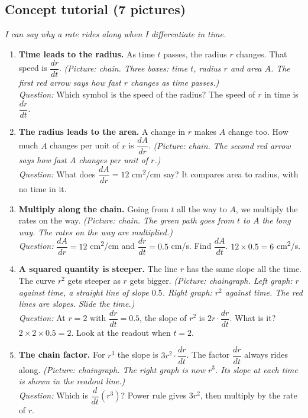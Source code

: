 \documentclass[11pt]{article}
\begin{document}
\subsection*{Concept tutorial (7 pictures)}
\textit{I can say why a rate rides along when I differentiate in time.}\par
\begin{enumerate}
\item \textbf{Time leads to the radius.} As time $t$ passes, the radius $r$ changes. That speed is $\dfrac{dr}{dt}$. \textit{(Picture: chain. Three boxes: time $t$, radius $r$ and area $A$. The first red arrow says how fast $r$ changes as time passes.)}\\ \textit{Question:} Which symbol is the speed of the radius?  The speed of $r$ in time is $\dfrac{dr}{dt}$.
\item \textbf{The radius leads to the area.} A change in $r$ makes $A$ change too. How much $A$ changes per unit of $r$ is $\dfrac{dA}{dr}$. \textit{(Picture: chain. The second red arrow says how fast $A$ changes per unit of $r$.)}\\ \textit{Question:} What does $\dfrac{dA}{dr}=12$ cm\textsuperscript{2}/cm say?  It compares area to radius, with no time in it.
\item \textbf{Multiply along the chain.} Going from $t$ all the way to $A$, we multiply the rates on the way. \textit{(Picture: chain. The green path goes from $t$ to $A$ the long way. The rates on the way are multiplied.)}\\ \textit{Question:} $\dfrac{dA}{dr}=12$ cm\textsuperscript{2}/cm and $\dfrac{dr}{dt}=0.5$ cm/s. Find $\dfrac{dA}{dt}$.  $12\times0.5=6$ cm\textsuperscript{2}/s.
\item \textbf{A squared quantity is steeper.} The line $r$ has the same slope all the time. The curve $r^2$ gets steeper as $r$ gets bigger. \textit{(Picture: chaingraph. Left graph: $r$ against time, a straight line of slope $0.5$. Right graph: $r^2$ against time. The red lines are slopes. Slide the time.)}\\ \textit{Question:} At $r=2$ with $\dfrac{dr}{dt}=0.5$, the slope of $r^2$ is $2r\cdot\dfrac{dr}{dt}$. What is it?  $2\times2\times0.5=2$. Look at the readout when $t=2$.
\item \textbf{The chain factor.} For $r^3$ the slope is $3r^2\cdot\dfrac{dr}{dt}$. The factor $\dfrac{dr}{dt}$ always rides along. \textit{(Picture: chaingraph. The right graph is now $r^3$. Its slope at each time is shown in the readout line.)}\\ \textit{Question:} Which is $\dfrac{d}{dt}(r^3)$?  Power rule gives $3r^2$, then multiply by the rate of $r$.

\end{enumerate}
\end{document}
